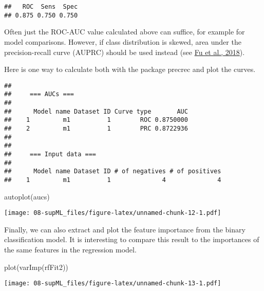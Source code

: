 \documentclass[
  oneside]{book}
\newenvironment{Shaded}{\begin{snugshade}}{\end{snugshade}}
\newcommand{\AttributeTok}[1]{\textcolor[rgb]{0.77,0.63,0.00}{#1}}
\newcommand{\FunctionTok}[1]{\textcolor[rgb]{0.00,0.00,0.00}{#1}}
\newcommand{\NormalTok}[1]{#1}
\newcommand{\OtherTok}[1]{\textcolor[rgb]{0.56,0.35,0.01}{#1}}
\newcommand{\SpecialCharTok}[1]{\textcolor[rgb]{0.00,0.00,0.00}{#1}}
\begin{document}
\begin{verbatim}
##   ROC  Sens  Spec 
## 0.875 0.750 0.750
\end{verbatim}

Often just the ROC-AUC value calculated above can suffice, for example for
model comparisons. However, if class distribution is skewed, area under the precision-recall curve
(AUPRC) should be used instead (see \href{https://doi.org/10.1002/bimj.201800148}{Fu et al., 2018}).

Here is one way to calculate both with the package precrec and plot the curves.

\begin{Shaded}
\end{Shaded}

\begin{verbatim}
## 
##     === AUCs ===
## 
##      Model name Dataset ID Curve type       AUC
##    1         m1          1        ROC 0.8750000
##    2         m1          1        PRC 0.8722936
## 
## 
##     === Input data ===
## 
##      Model name Dataset ID # of negatives # of positives
##    1         m1          1              4              4
\end{verbatim}

\begin{Shaded}
\begin{Highlighting}[]
\FunctionTok{autoplot}\NormalTok{(aucs)}
\end{Highlighting}
\end{Shaded}

\texttt{[image: 08-supML\_files/figure-latex/unnamed-chunk-12-1.pdf]}

Finally, we can also extract and plot the feature importance from the binary
classification model. It is interesting to compare this result to the importances
of the same features in the regression model.

\begin{Shaded}
\begin{Highlighting}[]
\FunctionTok{plot}\NormalTok{(}\FunctionTok{varImp}\NormalTok{(rfFit2))}
\end{Highlighting}
\end{Shaded}

\texttt{[image: 08-supML\_files/figure-latex/unnamed-chunk-13-1.pdf]}

  
\end{document}

